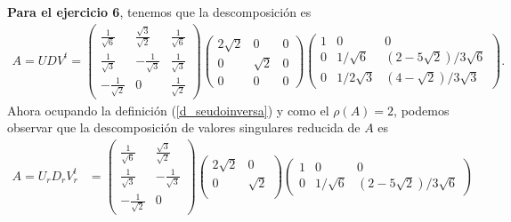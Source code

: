 \documentclass[11pt,letterpaper]{article}
\begin{document}
\begin{enumerate}
\textbf{Para el ejercicio 6}, tenemos que la descomposición es 
\begin{align*}
A=UD V^t=\begin{pmatrix}
\frac{1}{\sqrt{6}} & \frac{\sqrt{3}}{\sqrt{2}} & \frac{1}{\sqrt{6}}\\
\frac{1}{\sqrt{3}} & -\frac{1}{\sqrt{3}} & \frac{1}{\sqrt{3}}\\
-\frac{1}{\sqrt{2}} & 0 & \frac{1}{\sqrt{2}}
\end{pmatrix}
\begin{pmatrix}
2\sqrt{2} & 0 & 0\\
0 & \sqrt{2} & 0\\
0 & 0 & 0
\end{pmatrix}
\begin{pmatrix}
1 & 0 & 0\\ 
0 &  1/\sqrt{6} & (2-5\sqrt{2})/3\sqrt{6} \\
0 & 1/2\sqrt{3} & (4-\sqrt{2})/3\sqrt{3}
\end{pmatrix}.
\end{align*}
Ahora ocupando la definición (\ref{d_seudoinversa}) y como el $\rho(A)=2$, podemos observar que la descomposición de valores singulares reducida de $A$ es 
\begin{align*}
A=U_rD_r V_r^t&=\begin{pmatrix}
\frac{1}{\sqrt{6}} & \frac{\sqrt{3}}{\sqrt{2}} \\
\frac{1}{\sqrt{3}} & -\frac{1}{\sqrt{3}} \\
-\frac{1}{\sqrt{2}} & 0 
\end{pmatrix}
\begin{pmatrix}
2\sqrt{2} & 0\\
0 & \sqrt{2} \\
\end{pmatrix}
\begin{pmatrix}
1 & 0 & 0\\ 
0 &  1/\sqrt{6} & (2-5\sqrt{2})/3\sqrt{6}
\end{pmatrix}
\end{align*}




\end{enumerate}
\end{document}
